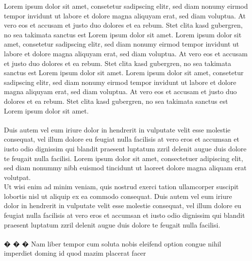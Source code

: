 \documentclass[
						a4paper,									 %
						9.5pt,											%
]{article}																%
\begin{document}
	
Lorem ipsum dolor sit amet, consetetur sadipscing elitr, sed diam nonumy eirmod tempor invidunt ut labore 
et dolore magna aliquyam erat, sed diam voluptua. At vero eos et accusam et justo duo dolores et ea 
rebum. Stet clita kasd gubergren, no sea takimata sanctus est Lorem ipsum dolor sit amet. Lorem ipsum 
dolor sit amet, consetetur sadipscing elitr, sed diam nonumy eirmod tempor invidunt ut labore et dolore 
magna aliquyam erat, sed diam voluptua. At vero eos et accusam et justo duo dolores et ea rebum. Stet 
clita kasd gubergren, no sea takimata sanctus est Lorem ipsum dolor sit amet. Lorem ipsum dolor sit amet, 
consetetur sadipscing elitr, sed diam nonumy eirmod tempor invidunt ut labore et dolore magna aliquyam 
erat, sed diam voluptua. At vero eos et accusam et justo duo dolores et ea rebum. Stet clita kasd 
gubergren, no sea takimata sanctus est Lorem ipsum dolor sit amet.
\\
\\
Duis autem vel eum iriure dolor in hendrerit in vulputate velit esse molestie consequat, vel illum dolore eu 
feugiat nulla facilisis at vero eros et accumsan et iusto odio dignissim qui blandit praesent luptatum zzril 
delenit augue duis dolore te feugait nulla facilisi. Lorem ipsum dolor sit amet, consectetuer adipiscing elit, 
sed diam nonummy nibh euismod tincidunt ut laoreet dolore magna aliquam erat volutpat. \\
Ut wisi enim ad minim veniam, quis nostrud exerci tation ullamcorper suscipit lobortis nisl ut aliquip ex ea 
commodo consequat. Duis autem vel eum iriure dolor in hendrerit in vulputate velit esse molestie 
consequat, vel illum dolore eu feugiat nulla facilisis at vero eros et accumsan et iusto odio dignissim qui 
blandit praesent luptatum zzril delenit augue duis dolore te feugait nulla facilisi.
\\
\\
� � � Nam liber tempor cum soluta nobis eleifend option congue nihil imperdiet doming id quod mazim placerat 
facer \autocites[S. 5]{baurSaechtlingKunststoffTaschenbuch2013}







\cleardoublepage %

\renewcommand{\bibname}{Literaturverzeichnis}
\printbibliography

\end{document}
